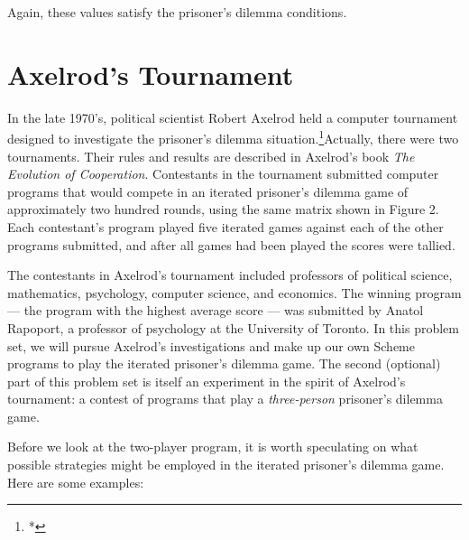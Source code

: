 \noindent Again, these values satisfy the prisoner's dilemma conditions.


\section{Axelrod's Tournament}

In the late 1970's, political scientist Robert Axelrod held a computer
tournament designed to investigate the prisoner's dilemma
situation.\footnote{*}{Actually, there were two tournaments. Their rules
and results are described in Axelrod's book {\sl The Evolution of
Cooperation}.} Contestants in the tournament submitted computer
programs that would compete in an iterated prisoner's dilemma game of
approximately two hundred rounds, using the same matrix shown in
Figure 2. Each contestant's program played five iterated games against
each of the other programs submitted, and after all games had been
played the scores were tallied.

The contestants in Axelrod's tournament included professors of
political science, mathematics, psychology, computer science, and
economics. The winning program --- the program with the highest
average score --- was submitted by Anatol Rapoport, a professor of
psychology at the University of Toronto. In this problem set, we will
pursue Axelrod's investigations and make up our own Scheme programs to
play the iterated prisoner's dilemma game. The second (optional) part
of this problem set is itself an experiment in the spirit of Axelrod's
tournament: a contest of programs that play a {\it three-person}
prisoner's dilemma game.

Before we look at the two-player program, it is worth speculating on
what possible strategies might be employed in the iterated prisoner's
dilemma game. Here are some examples:

